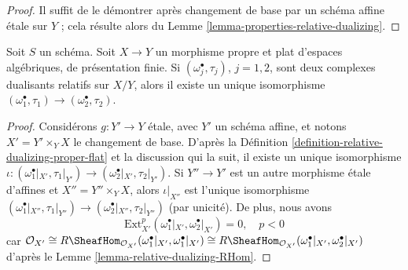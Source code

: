 \begin{proof}
Il suffit de le démontrer après changement de base par un schéma affine \'etale
sur $Y$ ; cela résulte alors du
Lemme \ref{lemma-properties-relative-dualizing}.
\end{proof}

\begin{lemma}
\label{lemma-uniqueness-relative-dualizing}
Soit $S$ un schéma. Soit $X \to Y$ un morphisme propre et plat
d'espaces algébriques, de présentation finie.
Si $(\omega_j^\bullet, \tau_j)$, $j = 1, 2$,
sont deux complexes dualisants relatifs sur $X/Y$,
alors il existe un unique isomorphisme
$(\omega_1^\bullet, \tau_1) \to (\omega_2^\bullet, \tau_2)$.
\end{lemma}

\begin{proof}
Considérons $g : Y' \to Y$ \'etale, avec $Y'$ un schéma affine,
et notons $X' = Y' \times_Y X$ le changement de base.
D'après la Définition \ref{definition-relative-dualizing-proper-flat}
et la discussion qui la suit, il existe un unique isomorphisme
$\iota : (\omega_1^\bullet|_{X'}, \tau_1|_{Y'}) \to
(\omega_2^\bullet|_{X'}, \tau_2|_{Y'})$. Si $Y'' \to Y'$
est un autre morphisme \'etale d'affines et $X'' = Y'' \times_Y X$,
alors $\iota|_{X''}$ est l'unique isomorphisme
$(\omega_1^\bullet|_{X''}, \tau_1|_{Y''}) \to
(\omega_2^\bullet|_{X''}, \tau_2|_{Y''})$ (par unicité).
De plus, nous avons
$$
\text{Ext}^p_{X'}(\omega_1^\bullet|_{X'}, \omega_2^\bullet|_{X'}) = 0,
\quad p < 0
$$
car
$\mathcal{O}_{X'} \cong
R\SheafHom_{\mathcal{O}_{X'}}(\omega_1^\bullet|_{X'}, \omega_1^\bullet|_{X'})
\cong
R\SheafHom_{\mathcal{O}_{X'}}(\omega_1^\bullet|_{X'}, \omega_2^\bullet|_{X'})$
d'après le Lemme \ref{lemma-relative-dualizing-RHom}.


\end{proof}
